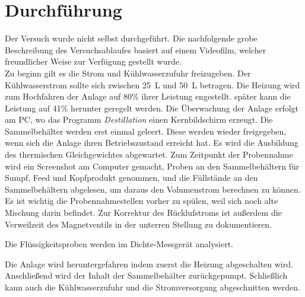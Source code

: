 \section{Durchführung}
\label{sec:durchfuerung}
Der Versuch wurde nicht selbst durchgeführt. Die nachfolgende grobe Beschreibung des Versuchsablaufes basiert auf einem Videofilm, welcher freundlicher Weise zur Verfügung gestellt wurde. \\
Zu beginn gilt es die Strom und Kühlwasserzufuhr freizugeben. Der Kühlwasserstrom sollte sich zwischen \SI{25}{\liter} und \SI{50}{\liter} betragen. Die Heizung wird zum Hochfahren der Anlage auf 80\% ihrer Leistung engestellt. später kann die Leistung auf 41\% herunter geregelt werden. Die Überwachung der Anlage erfolgt am PC, wo das Programm \emph{Destillation} einen Kernbildschirm erzeugt.
Die Sammelbehälter werden erst einmal geleert. Diese werden wieder freigegeben, wenn sich die Anlage ihren Betriebszustand erreicht hat. Es wird die Ausbildung des thermischen Gleichgewichtes abgewartet. Zum Zeitpunkt der Probennahme wird ein Screenshot am Computer gemacht, Proben an den Sammelbehältern für Sumpf, Feed und Kopfprodukt genommen, und die Füllstände an den Sammelbehältern abgelesen, um daraus den Volumenstrom berechnen zu können. Es ist wichtig die Probennahmestellen vorher zu spülen, weil sich noch alte Mischung darin befindet. Zur Korrektur des Rücklufstroms ist außerdem die Verweilzeit des Magnetventils in der unterren Stellung zu dokumentieren.

Die Flüssigkeitsproben werden im Dichte-Messgerät analysiert.

Die Anlage wird heruntergefahren indem zuerst die Heizung abgeschalten wird. Anschließend wird der Inhalt der Sammelbehälter zurückgepumpt. Schließlich kann auch die Kühlwasserzufuhr und die Stromversorgung abgeschnitten werden.